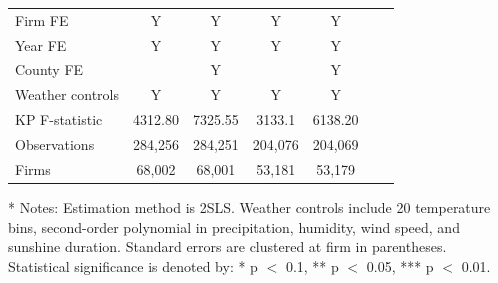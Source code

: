 \documentclass[12pt]{article}
\begin{document}
\begin{table}[H]
\begin{tabular}{l*{6}{c}}
    \hline
    Firm FE              &Y&Y&Y&Y\\
    Year FE              &Y&Y&Y&Y\\
    County FE            & &Y&&Y\\
    Weather controls     &Y&Y&Y&Y\\
    KP F-statistic       &4312.80 &7325.55&3133.1&6138.20\\
    Observations         &284,256 &284,251&204,076&204,069  \\
    Firms                &68,002  &68,001 &53,181&53,179      \\
    \hline\hline
  \end{tabular}
\begin{tablenotes}
    \item[*] \small Notes: Estimation method is 2SLS. Weather controls include 20 temperature bins, second-order polynomial in precipitation, humidity, wind speed, and sunshine duration. Standard errors are clustered at firm in parentheses. Statistical significance is denoted by: * p $<$ 0.1, ** p $<$ 0.05, *** p $<$ 0.01.
  \end{tablenotes}
\end{table}
\end{document}
